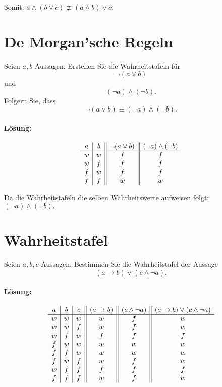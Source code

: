 \documentclass[
				a4paper,
				10pt
			]
			{scrartcl}
\begin{document}
Somit: $a\land (b \lor c) \not\equiv (a\land b) \lor c$.

\section{De Morgan'sche Regeln}
Seien $a,b$ Aussagen.
Erstellen Sie die Wahrheitstafeln f\"ur
$$
	\neg (a \lor b)
$$
und
$$
	(\neg a) \land (\neg b). 
$$
Folgern Sie, dass
$$
	\neg (a \lor b) \equiv (\neg a) \land (\neg b). 
$$

\paragraph{L\"osung:}
$$
	\begin{array}{c | c || c || c}
		a	&b	& \neg (a \lor b)	& (\neg a) \land (\neg b)	\\ \hline
		w	&w	& f			& f					\\
		w	&f	& f			& f					\\
		f	&w	& f			& f					\\
		f	&f	& w			& w
	\end{array}
$$

Da die Wahrheitstafeln die selben Wahrheitswerte aufweisen folgt: $(\neg a) \land (\neg b).$

\newpage
\section{Wahrheitstafel}
Seien $a,b,c$ Aussagen. 
Bestimmen Sie die Wahrheitstafel der Aussage
$$
	(a \rightarrow b) \lor (c \land \neg a).
$$

\paragraph{L\"osung:}

$$
	\begin{array}{c | c | c || c || c || c }
		a	&b	&c	& (a \rightarrow b)	& (c \land \neg a)	& (a \rightarrow b) \lor (c \land \neg a)	\\ \hline
		w	&w	&w	& w				& f				& w								\\
		w	&w	&f	& w				& f				& w								\\
		w	&f	&w	& f				& f				& f								\\
		f	&w	&w	& w				& w				& w								\\
		f	&f	&w	& w				& w				& w								\\
		f	&w	&f	& w				& f				& w								\\
		w	&f	&f	& f				& f				& f								\\
		f	&f	&f	& w				& f				& w
	\end{array}
$$
\end{document}

